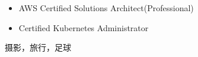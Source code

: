 \documentclass{resume}
\begin{document}



\begin{body}
	\begin{itemize}[noitemsep,topsep=0pt]
		\item AWS Certified Solutions Architect(Professional)
		\item Certified Kubernetes Administrator
	\end{itemize}
\end{body}


\begin{body}
	摄影，旅行，足球
\end{body}
\end{document}
